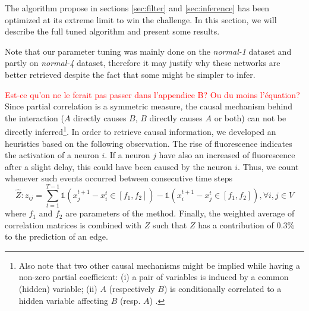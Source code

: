 \documentclass[wcp]{jmlr}
\begin{document}
%


\vspace{5cm}







The algorithm propose in sections \ref{sec:filter} and \ref{sec:inference} has been optimized at its extreme limit to win the challenge. In this section, we will describe the full tuned algorithm and present some results.

Note that our parameter tuning was mainly
done on the \textit{normal-1} dataset and partly on \textit{normal-4} dataset,
therefore it may justify why these networks are better retrieved despite the
fact that some might be simpler to infer.

\textcolor{red}{Est-ce qu'on ne le ferait pas passer dans l'appendice B? Ou du moins l'équation?}
Since partial correlation is a symmetric measure, the causal mechanism behind the
interaction ($A$ directly causes $B$, $B$ directly causes $A$ or both) can not
be directly inferred\footnote{Also note that two other causal mechanisms might be
implied while having a non-zero partial coefficient: (i) a pair of variables
is induced by a common (hidden) variable; (ii) $A$ (respectively $B$) is
conditionally correlated to a hidden variable affecting $B$ (resp. $A$)
\citep{de2004discovery}.}.
In order to retrieve causal information, we developed an
heuristics based on the following observation. The rise of fluorescence
indicates the activation of a neuron $i$. If a neuron $j$ have also
an increased of fluorescence after a slight delay, this could have been
caused by the neuron $i$. Thus, we count whenever
such events occurred between consecutive time steps
\[
\hat{Z}: z_{ij} = \sum_{t=1}^{T - 1}
    \mathbb{1}(x_j^{t+1} - x_i^t \in \left[f_1, f_2 \right]) -
    \mathbb{1}(x_i^{t+1} - x_j^t \in \left[f_1, f_2 \right]), \forall i, j \in V
\]
where $f_1$ and $f_2$ are parameters of the method.
Finally, the weighted average of correlation matrices is combined with $Z$ such
that $Z$ has a contribution of $0.3\%$ to the prediction of an edge.

\end{document}
